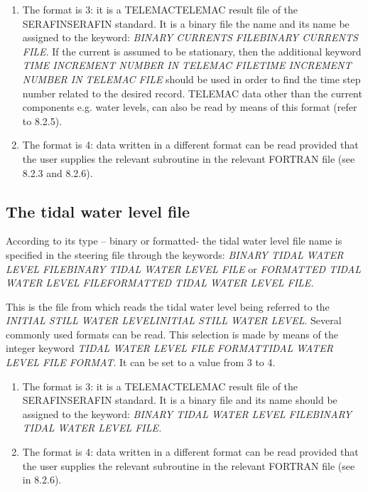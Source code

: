\begin{enumerate}
\item  The format is 3: it is a TELEMACTELEMAC result file of the SERAFINSERAFIN standard. It is a binary file the name and its name be assigned to the keyword: \textit{BINARY CURRENTS FILEBINARY CURRENTS FILE}. If the current is assumed to be stationary, then the additional keyword \textit{TIME INCREMENT NUMBER IN TELEMAC FILETIME INCREMENT NUMBER IN TELEMAC FILE }should be used in order to find the time step number related to the desired record. TELEMAC data other than the current components e.g. water levels, can also be read by means of this format (refer to 8.2.5).

\item  The format is 4: data written in a different format can be read provided that the user supplies the relevant subroutine in the relevant FORTRAN file (see 8.2.3 and 8.2.6).
\end{enumerate}


\subsection{ The tidal water level file}

 According to its type -- binary or formatted- the tidal water level file name is specified in the steering file through the keywords: \textit{BINARY TIDAL WATER LEVEL FILEBINARY TIDAL WATER LEVEL FILE }or\textit{ FORMATTED TIDAL WATER LEVEL FILEFORMATTED TIDAL WATER LEVEL FILE.}

 This is the file from which \tomawac reads the tidal water level being referred to the \textit{INITIAL STILL WATER LEVELINITIAL STILL WATER LEVEL}. Several commonly used formats can be read. This selection is made by means of the integer keyword \textit{TIDAL WATER LEVEL FILE FORMATTIDAL WATER LEVEL FILE FORMAT}. It can\textit{ }be set to a value from 3 to 4.

\begin{enumerate}
\item  The format is 3: it is a TELEMACTELEMAC result file of the SERAFINSERAFIN standard. It is a binary file and its name should be assigned to the keyword: \textit{BINARY TIDAL WATER LEVEL FILEBINARY TIDAL WATER LEVEL FILE.}

\item  The format is 4: data written in a different format can be read provided that the user supplies the relevant subroutine in the relevant FORTRAN file (see in 8.2.6).
\end{enumerate}


